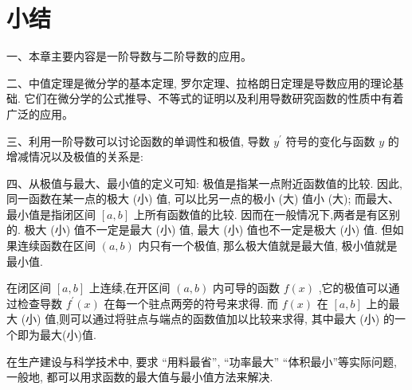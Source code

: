 \documentclass[lang=cn,newtx,10pt,scheme=chinese]{elegantbook}
\begin{document}
\chapter*{小结}

一、本章主要内容是一阶导数与二阶导数的应用。

二、中值定理是微分学的基本定理, 罗尔定理、拉格朗日定理是导数应用的理论基础. 它们在微分学的公式推导、不等式的证明以及利用导数研究函数的性质中有着广泛的应用。

三、利用一阶导数可以讨论函数的单调性和极值, 导数 \({y}^{\prime }\) 符号的变化与函数 \(y\) 的增减情况以及极值的关系是:

\begin{center}
\end{center}

四、从极值与最大、最小值的定义可知: 极值是指某一点附近函数值的比较. 因此, 同一函数在某一点的极大 (小) 值, 可以比另一点的极小 (大) 值小 (大); 而最大、最小值是指闭区间 \(\left\lbrack {a,b}\right\rbrack\) 上所有函数值的比较. 因而在一般情况下,两者是有区别的. 极大 (小) 值不一定是最大 (小) 值, 最大 (小) 值也不一定是极大 (小) 值. 但如果连续函数在区间 \(\left( {a,b}\right)\) 内只有一个极值, 那么极大值就是最大值, 极小值就是最小值.

在闭区间 \(\left\lbrack {a,b}\right\rbrack\) 上连续,在开区间 \(\left( {a,b}\right)\) 内可导的函数 \(f\left( x\right)\) ,它的极值可以通过检查导数 \({f}^{\prime }\left( x\right)\) 在每一个驻点两旁的符号来求得. 而 \(f\left( x\right)\) 在 \(\left\lbrack {a,b}\right\rbrack\) 上的最大 (小) 值,则可以通过将驻点与端点的函数值加以比较来求得, 其中最大 (小) 的一个即为最大(小)值.

在生产建设与科学技术中, 要求 “用料最省”, “功率最大” “体积最小”等实际问题, 一般地, 都可以用求函数的最大值与最小值方法来解决.
\end{document}
